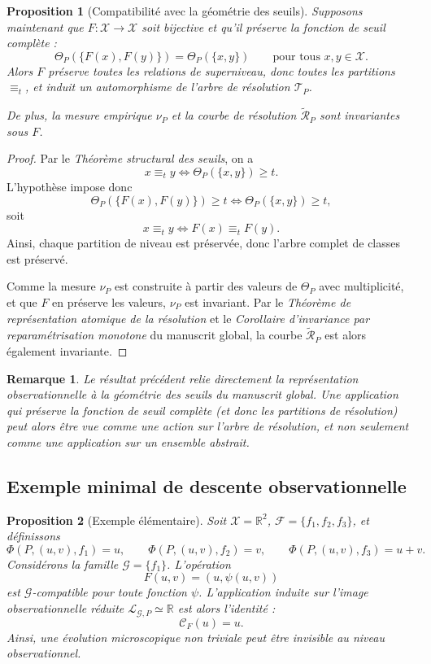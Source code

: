 \documentclass[11pt,a4paper]{article}
\newtheorem{proposition}{Proposition}
\newtheorem{remark}{Remarque}
\begin{document}
\begin{appendices}
\begin{proposition}[Compatibilité avec la géométrie des seuils]
\label{prop:seuils-calcul}
Supposons maintenant que \(F:\mathcal X\to\mathcal X\) soit bijective et qu'il préserve la fonction de seuil complète :
\[
\Theta_P(\{F(x),F(y)\})=\Theta_P(\{x,y\})
\qquad\text{pour tous }x,y\in\mathcal X.
\]
Alors \(F\) préserve toutes les relations de superniveau, donc toutes les partitions \(\equiv_t\), et induit un automorphisme de l'arbre de résolution \(\mathcal T_P\).

De plus, la mesure empirique \(\nu_P\) et la courbe de résolution \(\widetilde{\mathcal R}_P\) sont invariantes sous \(F\).
\end{proposition}

\begin{proof}
Par le \emph{Théorème structural des seuils}, on a
\[
x\equiv_t y
\Longleftrightarrow
\Theta_P(\{x,y\})\ge t.
\]
L'hypothèse impose donc
\[
\Theta_P(\{F(x),F(y)\})\ge t
\Longleftrightarrow
\Theta_P(\{x,y\})\ge t,
\]
soit
\[
x\equiv_t y \Longleftrightarrow F(x)\equiv_t F(y).
\]
Ainsi, chaque partition de niveau est préservée, donc l'arbre complet de classes est préservé.

Comme la mesure \(\nu_P\) est construite à partir des valeurs de \(\Theta_P\) avec multiplicité, et que \(F\) en préserve les valeurs, \(\nu_P\) est invariant. Par le \emph{Théorème de représentation atomique de la résolution} et le \emph{Corollaire d'invariance par reparamétrisation monotone} du manuscrit global, la courbe \(\widetilde{\mathcal R}_P\) est alors également invariante.
\end{proof}

\begin{remark}
Le résultat précédent relie directement la représentation observationnelle à la géométrie des seuils du manuscrit global. Une application qui préserve la fonction de seuil complète (et donc les partitions de résolution) peut alors être vue comme une action sur l'arbre de résolution, et non seulement comme une application sur un ensemble abstrait.
\end{remark}

\subsection{Exemple minimal de descente observationnelle}

\begin{proposition}[Exemple élémentaire]
Soit \(\mathcal X=\mathbb R^2\), \(\mathcal F=\{f_1,f_2,f_3\}\), et définissons
\[
\Phi(P,(u,v),f_1)=u,\qquad
\Phi(P,(u,v),f_2)=v,\qquad
\Phi(P,(u,v),f_3)=u+v.
\]
Considérons la famille \(\mathcal G=\{f_1\}\). L'opération
\[
F(u,v)=(u,\psi(u,v))
\]
est \(\mathcal G\)-compatible pour toute fonction \(\psi\). L'application induite sur l'image observationnelle réduite \(\mathcal L_{\mathcal G,P}\simeq\mathbb R\) est alors l'identité :
\[
\mathcal C_F(u)=u.
\]
Ainsi, une évolution microscopique non triviale peut être invisible au niveau observationnel.
\end{proposition}


\end{appendices}
\end{document}
